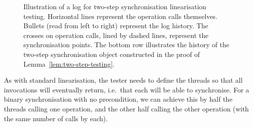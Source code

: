 \begin{figure}[tp]
\def\twoStep(#1,#2)#3{%
  \draw(#1-0.2,#2) \X; \draw(#1+0.2,#2) \X;
  \draw(#1,#2-0.4) node{\footnotesize #3};
}
\begin{center}
\end{center}
\caption{Illustration of a log for two-step synchronisation linearisation
  testing.  Horizontal lines represent the operation calls themselves.
  Bullets (read from left to right) represent the log history.  The crosses on
  operation calls, lined by dashed lines, represent the synchronisation
  points.  The bottom row illustrates the history of the two-step
  synchronisation object constructed in the proof of
  Lemma~\ref{lem:two-step-testing}.}
\label{fig:two-step-log}
\end{figure}


As with standard linearisation, the tester needs to define the
threads so that all invocations will eventually return, i.e.~that each will be
able to synchronise.  For a binary synchronisation with no precondition, we
can achieve this by half the threads calling one operation, and the other half
calling the other operation (with the same number of calls by each).

